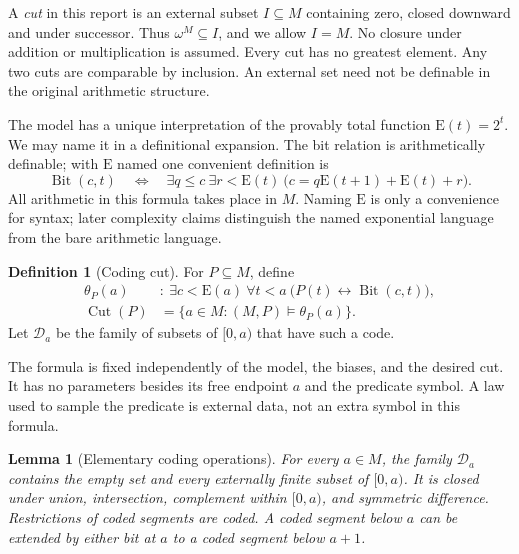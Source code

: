 \documentclass[11pt]{article}
\numberwithin{equation}{section}
\newtheorem{lemma}[theorem]{Lemma}
\theoremstyle{definition}
\newtheorem{definition}[theorem]{Definition}
\theoremstyle{remark}
\newcommand{\std}{\omega^M}
\newcommand{\E}{\mathrm E}
\newcommand{\Bit}{\operatorname{Bit}}
\newcommand{\Cut}{\operatorname{Cut}}
\newcommand{\coded}{\mathcal D}
\begin{document}
A \emph{cut} in this report is an external subset $I\subseteq M$ containing
zero, closed downward and under successor. Thus $\std\subseteq I$, and
we allow $I=M$. No closure under addition or multiplication is assumed.
Every cut has no greatest element. Any two cuts are comparable by inclusion.
An external set need not be definable in the original arithmetic structure.

The model has a unique interpretation of the provably total function
$\E(t)=2^t$. We may name it in a definitional expansion. The bit relation is
arithmetically definable; with $\E$ named one convenient definition is
\begin{equation}
\Bit(c,t)\quad\Longleftrightarrow\quad
\exists q\le c\ \exists r<\E(t)\
 \bigl(c=q\E(t+1)+\E(t)+r\bigr).
\label{rbc:eq:bit}
\end{equation}
All arithmetic in this formula takes place in $M$. Naming $\E$ is only a
convenience for syntax; later complexity claims distinguish the named
exponential language from the bare arithmetic language.

\begin{definition}[Coding cut]
For $P\subseteq M$, define
\begin{align}
 \theta_P(a)&:\ \exists c<\E(a)\ \forall t<a\
                  \bigl(P(t)\leftrightarrow\Bit(c,t)\bigr),
                  \label{rbc:eq:theta}\\
 \Cut(P)&=\{a\in M:(M,P)\models\theta_P(a)\}.
                  \label{rbc:eq:cut}
\end{align}
Let $\coded_a$ be the family of subsets of $[0,a)$ that have such a code.
\end{definition}

The formula is fixed independently of the model, the biases, and the desired
cut. It has no parameters besides its free endpoint $a$ and the predicate
symbol. A law used to sample the predicate is external data, not an extra
symbol in this formula.

\begin{lemma}[Elementary coding operations]
\label{rbc:lem:code-operations}
For every $a\in M$, the family $\coded_a$ contains the empty set and every
externally finite subset of $[0,a)$. It is closed under union, intersection,
complement within $[0,a)$, and symmetric difference. Restrictions of coded
segments are coded. A coded segment below $a$ can be extended by either bit
at $a$ to a coded segment below $a+1$.
\end{lemma}
\end{document}
